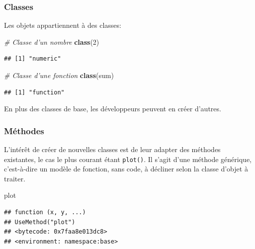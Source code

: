 \documentclass[
  12pt,
  french,
  a4paper,
  extrafontsizes,onecolumn,openright
  ]{memoir}
\newenvironment{Shaded}{\begin{snugshade}}{\end{snugshade}}
\newcommand{\CommentTok}[1]{\textcolor[rgb]{0.56,0.35,0.01}{\textit{#1}}}
\newcommand{\DecValTok}[1]{\textcolor[rgb]{0.00,0.00,0.81}{#1}}
\newcommand{\KeywordTok}[1]{\textcolor[rgb]{0.13,0.29,0.53}{\textbf{#1}}}
\newcommand{\NormalTok}[1]{#1}
\begin{document}
\hypertarget{classes}{%
\subsubsection{Classes}\label{classes}}

Les objets appartiennent à des classes:

\scriptsize

\begin{Shaded}
\begin{Highlighting}[]
\CommentTok{# Classe d'un nombre}
\KeywordTok{class}\NormalTok{(}\DecValTok{2}\NormalTok{)}
\end{Highlighting}
\end{Shaded}

\begin{verbatim}
## [1] "numeric"
\end{verbatim}

\begin{Shaded}
\begin{Highlighting}[]
\CommentTok{# Classe d'une fonction}
\KeywordTok{class}\NormalTok{(sum)}
\end{Highlighting}
\end{Shaded}

\begin{verbatim}
## [1] "function"
\end{verbatim}

\normalsize

En plus des classes de base, les développeurs peuvent en créer d'autres.

\hypertarget{muxe9thodes}{%
\subsubsection{Méthodes}\label{muxe9thodes}}

L'intérêt de créer de nouvelles classes est de leur adapter des méthodes existantes, le cas le plus courant étant \texttt{plot()}.
Il s'agit d'une méthode générique, c'est-à-dire un modèle de fonction, sans code, à décliner selon la classe d'objet à traiter.

\scriptsize

\begin{Shaded}
\begin{Highlighting}[]
\NormalTok{plot}
\end{Highlighting}
\end{Shaded}

\begin{verbatim}
## function (x, y, ...) 
## UseMethod("plot")
## <bytecode: 0x7faa8e013dc8>
## <environment: namespace:base>
\end{verbatim}
\end{document}
